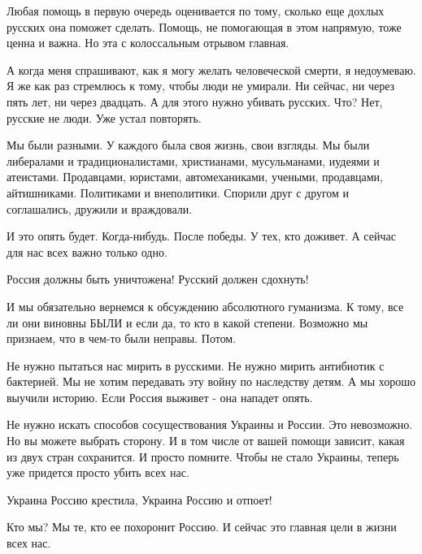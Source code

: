 Любая помощь в первую очередь оценивается по тому, сколько еще дохлых русских
она поможет сделать. Помощь, не помогающая в этом напрямую, тоже ценна и важна.
Но эта с колоссальным отрывом главная. 

А когда меня спрашивают, как я могу желать человеческой смерти, я недоумеваю. Я
же как раз стремлюсь к тому, чтобы люди не умирали. Ни сейчас, ни через пять
лет, ни через двадцать. А для этого нужно убивать русских. Что? Нет, русские не
люди. Уже устал повторять. 

Мы были разными. У каждого была своя жизнь, свои взгляды. Мы были либералами и
традиционалистами, христианами, мусульманами, иудеями и атеистами. Продавцами,
юристами, автомеханиками, учеными, продавцами, айтишниками. Политиками и
внеполитики. Спорили друг с другом и соглашались, дружили и враждовали. 

И это опять будет. Когда-нибудь. После победы. У тех, кто доживет. А сейчас для
нас всех важно только одно. 

Россия должны быть уничтожена! Русский должен сдохнуть!

И мы обязательно вернемся к обсуждению абсолютного гуманизма. К тому, все ли
они виновны БЫЛИ и если да, то кто в какой степени. Возможно мы признаем, что в
чем-то были неправы. Потом. 

Не нужно пытаться нас мирить в русскими. Не нужно мирить антибиотик с
бактерией. Мы не хотим передавать эту войну по наследству детям. А мы хорошо
выучили историю. Если Россия выживет - она нападет опять. 

Не нужно искать способов сосуществования Украины и России. Это невозможно. Но
вы можете выбрать сторону. И в том числе от вашей помощи зависит, какая из двух
стран сохранится. И просто помните. Чтобы не стало Украины, теперь уже придется
просто убить всех нас. 

Украина Россию крестила, Украина Россию и отпоет! 

Кто мы? Мы те, кто ее похоронит Россию. И сейчас это главная цели в жизни всех
нас.

